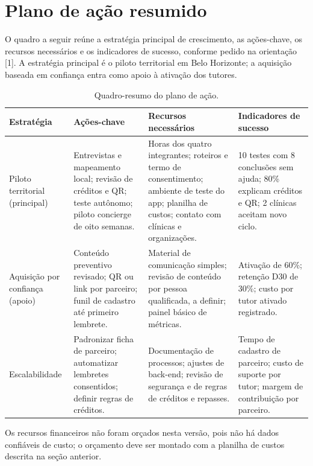 \documentclass[12pt,a4paper]{article}
\begin{document}
\section{Plano de ação resumido}

O quadro a seguir reúne a estratégia principal de crescimento, as ações-chave, os recursos necessários e os indicadores de sucesso, conforme pedido na orientação [1]. A estratégia principal é o piloto territorial em Belo Horizonte; a aquisição baseada em confiança entra como apoio à ativação dos tutores.

\begin{table}[H]
\centering
\small
\caption{Quadro-resumo do plano de ação.}
\begin{tabularx}{\textwidth}{P{2.7cm}YYY}
\toprule
\textbf{Estratégia} & \textbf{Ações-chave} & \textbf{Recursos necessários} & \textbf{Indicadores de sucesso} \\
\midrule
Piloto territorial (principal) & Entrevistas e mapeamento local; revisão de créditos e QR; teste autônomo; piloto concierge de oito semanas. & Horas dos quatro integrantes; roteiros e termo de consentimento; ambiente de teste do app; planilha de custos; contato com clínicas e organizações. & 10 testes com 8 conclusões sem ajuda; 80\% explicam créditos e QR; 2 clínicas aceitam novo ciclo. \\
Aquisição por confiança (apoio) & Conteúdo preventivo revisado; QR ou link por parceiro; funil de cadastro até primeiro lembrete. & Material de comunicação simples; revisão de conteúdo por pessoa qualificada, a definir; painel básico de métricas. & Ativação de 60\%; retenção D30 de 30\%; custo por tutor ativado registrado. \\
Escalabilidade & Padronizar ficha de parceiro; automatizar lembretes consentidos; definir regras de créditos. & Documentação de processos; ajustes de back-end; revisão de segurança e de regras de créditos e repasses. & Tempo de cadastro de parceiro; custo de suporte por tutor; margem de contribuição por parceiro. \\
\bottomrule
\end{tabularx}
\end{table}

Os recursos financeiros não foram orçados nesta versão, pois não há dados confiáveis de custo; o orçamento deve ser montado com a planilha de custos descrita na seção anterior.
\end{document}
